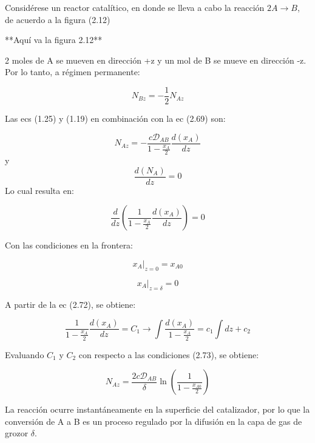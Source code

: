 Considérese un reactor catalítico, en donde se lleva a cabo la reacción $2A\rightarrow B$, de acuerdo a la figura (2.12)

**Aquí va la figura 2.12**

2 moles de A se mueven en dirección +z y un mol de B se mueve en dirección -z. Por lo tanto, a régimen permanente:

\begin{equation}
    N_{Bz}=-\frac{1}{2}N_{Az}
\end{equation}

Las ecs (1.25) y (1.19) en combinación con la ec (2.69) son:

\begin{equation}
    N_{Az}=-\frac{c\mathscr{D}_{AB}}{1-\frac{x_A}{2}}\frac{d(x_A)}{dz}
\end{equation}
y 
\begin{equation}
    \frac{d(N_A)}{dz}=0
\end{equation}
Lo cual resulta en:

\begin{equation}
    \frac{d}{dz}(\frac{1}{1-\frac{x_A}{2}}\frac{d(x_A)}{dz})=0
\end{equation}

Con las condiciones en la frontera:

\begin{equation*}
    x_A|_{z=0}=x_{A0} 
\end{equation*}

\begin{equation}
    x_A|_{z=\delta}=0
\end{equation}

A partir de la ec (2.72), se obtiene:

\begin{equation*}
    \frac{1}{1-\frac{x_A}{2}}\frac{d(x_A)}{dz}=C_1\longrightarrow \int\frac{d(x_A)}{1-\frac{x_A}{2}}=c_1\int dz +c_2
\end{equation*}

Evaluando $C_1$ y $C_2$ con respecto a las condiciones (2.73), se obtiene:

\begin{equation}
    N_{Az}=\frac{2c\mathscr{D}_{AB}}{\delta}\ln(\frac{1}{1-\frac{x_{A0}}{2}})
\end{equation}

La reacción ocurre instantáneamente en la superficie del catalizador, por lo que la conversión de A a B es un proceso regulado por la difusión en la capa de gas de grozor $\delta$. 

